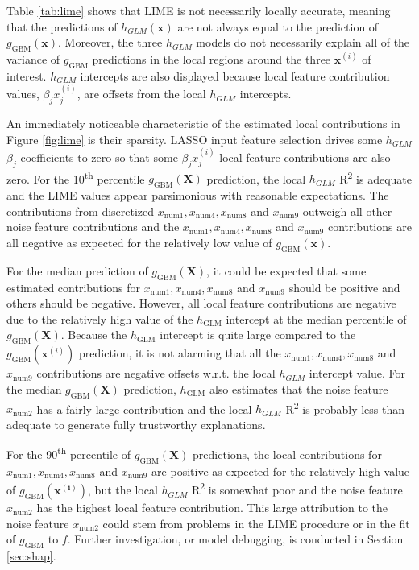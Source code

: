 \documentclass[sigconf, review]{acmart}
\begin{document}
Table \ref{tab:lime} shows that LIME is not necessarily locally accurate, meaning that the predictions of $h_{GLM}(\mathbf{x})$ are not always equal to the prediction of $g_{\text{GBM}}(\mathbf{x})$. Moreover, the three $h_{GLM}$ models do not necessarily explain all of the variance of $g_{\text{GBM}}$ predictions in the local regions around the three $\mathbf{x}^{(i)}$ of interest. $h_{GLM}$ intercepts are also displayed because local feature contribution values, $\beta_j x_j^{(i)}$, are offsets from the local $h_{GLM}$ intercepts.

An immediately noticeable characteristic of the estimated local contributions in Figure \ref{fig:lime} is their sparsity. LASSO input feature selection drives some $h_{GLM}$ $\beta_j$ coefficients to zero so that some $\beta_j x_j^{(i)}$ local feature contributions are also zero. For the 10\textsuperscript{th} percentile $g_{\text{GBM}}(\mathbf{X})$ prediction, the local $h_{GLM}$ R\textsuperscript{2} is adequate and the LIME values appear parsimonious with reasonable expectations. The contributions from discretized $x_{\text{num}1}, x_{\text{num}4}, x_{\text{num}8}$ and $x_{\text{num}9}$ outweigh all other noise feature contributions and the $x_{\text{num}1}, x_{\text{num}4}, x_{\text{num}8}$ and $x_{\text{num}9}$ contributions are all negative as expected for the relatively low value of $g_{\text{GBM}}(\mathbf{x})$. 

For the median prediction of $g_{\text{GBM}}(\mathbf{X})$, it could be expected that some estimated contributions for $x_{\text{num}1}, x_{\text{num}4}, x_{\text{num}8}$ and $x_{\text{num}9}$ should be positive and others should be negative. However, all local feature contributions are negative due to the relatively high value of the $h_{\text{GLM}}$ intercept at the median percentile of $g_{\text{GBM}}(\mathbf{X})$. Because the $h_{\text{GLM}}$ intercept is quite large compared to the $g_{\text{GBM}}(\mathbf{x}^{(i)})$ prediction, it is not alarming that all the $x_{\text{num}1}, x_{\text{num}4}, x_{\text{num}8}$ and $x_{\text{num}9}$ contributions are negative offsets w.r.t. the local $h_{GLM}$ intercept value. For the median $g_{\text{GBM}}(\mathbf{X})$ prediction, $h_{\text{GLM}}$ also estimates that the noise feature $x_{\text{num}2}$ has a fairly large contribution and the local $h_{GLM}$ R\textsuperscript{2} is probably less than adequate to generate fully trustworthy explanations.

For the 90\textsuperscript{th} percentile of $g_{\text{GBM}}(\mathbf{X})$ predictions, the local contributions for $x_{\text{num}1}, x_{\text{num}4}, x_{\text{num}8}$ and $x_{\text{num}9}$ are positive as expected for the relatively high value of $g_{\text{GBM}}(\mathbf{x^{(i)}})$, but the local $h_{GLM}$ R\textsuperscript{2} is somewhat poor and the noise feature $x_{\text{num}2}$ has the highest local feature contribution. This large attribution to the noise feature $x_{\text{num}2}$ could stem from problems in the LIME procedure or in the fit of $g_{\text{GBM}}$ to $f$. Further investigation, or model debugging, is conducted in Section \ref{sec:shap}.
\end{document}
